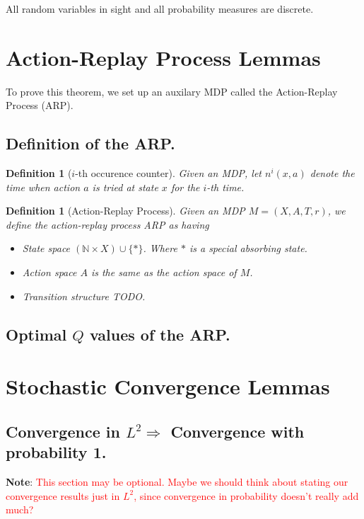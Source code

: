 \documentclass{article}
\newcommand{\red}[1]{\textcolor{red}{#1}}
\newtheorem{defn}[theorem]{Definition}
\begin{document}
All random variables in sight and all probability measures are discrete. 

\section{Action-Replay Process Lemmas}
To prove this theorem, we set up an auxilary MDP called the Action-Replay Process (ARP). 
\subsection{Definition of the ARP.}
\begin{defn}[$i$-th occurence counter]
Given an MDP, let $n^i(x,a)$ denote the time when action $a$ is tried at state $x$ for the $i$-th time. 
\end{defn}

\begin{defn}[Action-Replay Process]
Given an MDP $M = (X,A,T,r)$, we define the action-replay process ARP as having 
\begin{itemize}
    \item State space $(\mathbb{N}\times X) \cup \{\ast\}$. Where $\ast$ is a special absorbing state.
    \item Action space $A$ is the same as the action space of $M$.
    \item Transition structure TODO. 
\end{itemize}
\end{defn}

\subsection{Optimal $Q$ values of the ARP.}

\section{Stochastic Convergence Lemmas}
\subsection{Convergence in $L^2 \Rightarrow$ Convergence with probability 1.}
\textbf{Note}: \red{This section may be optional. Maybe we should think about stating our convergence results just in $L^2$, since convergence in probability doesn't really add much?}
\end{document}
